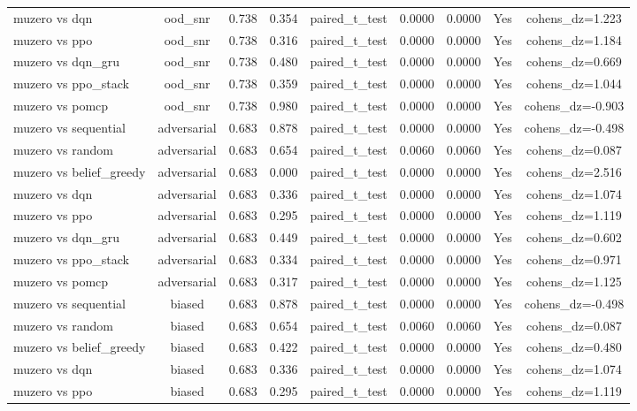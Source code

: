 \begin{table}[htbp]
\begin{tabular}{lcccccccc}
muzero vs dqn & ood_snr & 0.738 & 0.354 & paired_t_test & 0.0000 & 0.0000 & Yes & cohens_dz=1.223 \\
muzero vs ppo & ood_snr & 0.738 & 0.316 & paired_t_test & 0.0000 & 0.0000 & Yes & cohens_dz=1.184 \\
muzero vs dqn_gru & ood_snr & 0.738 & 0.480 & paired_t_test & 0.0000 & 0.0000 & Yes & cohens_dz=0.669 \\
muzero vs ppo_stack & ood_snr & 0.738 & 0.359 & paired_t_test & 0.0000 & 0.0000 & Yes & cohens_dz=1.044 \\
muzero vs pomcp & ood_snr & 0.738 & 0.980 & paired_t_test & 0.0000 & 0.0000 & Yes & cohens_dz=-0.903 \\
muzero vs sequential & adversarial & 0.683 & 0.878 & paired_t_test & 0.0000 & 0.0000 & Yes & cohens_dz=-0.498 \\
muzero vs random & adversarial & 0.683 & 0.654 & paired_t_test & 0.0060 & 0.0060 & Yes & cohens_dz=0.087 \\
muzero vs belief_greedy & adversarial & 0.683 & 0.000 & paired_t_test & 0.0000 & 0.0000 & Yes & cohens_dz=2.516 \\
muzero vs dqn & adversarial & 0.683 & 0.336 & paired_t_test & 0.0000 & 0.0000 & Yes & cohens_dz=1.074 \\
muzero vs ppo & adversarial & 0.683 & 0.295 & paired_t_test & 0.0000 & 0.0000 & Yes & cohens_dz=1.119 \\
muzero vs dqn_gru & adversarial & 0.683 & 0.449 & paired_t_test & 0.0000 & 0.0000 & Yes & cohens_dz=0.602 \\
muzero vs ppo_stack & adversarial & 0.683 & 0.334 & paired_t_test & 0.0000 & 0.0000 & Yes & cohens_dz=0.971 \\
muzero vs pomcp & adversarial & 0.683 & 0.317 & paired_t_test & 0.0000 & 0.0000 & Yes & cohens_dz=1.125 \\
muzero vs sequential & biased & 0.683 & 0.878 & paired_t_test & 0.0000 & 0.0000 & Yes & cohens_dz=-0.498 \\
muzero vs random & biased & 0.683 & 0.654 & paired_t_test & 0.0060 & 0.0060 & Yes & cohens_dz=0.087 \\
muzero vs belief_greedy & biased & 0.683 & 0.422 & paired_t_test & 0.0000 & 0.0000 & Yes & cohens_dz=0.480 \\
muzero vs dqn & biased & 0.683 & 0.336 & paired_t_test & 0.0000 & 0.0000 & Yes & cohens_dz=1.074 \\
muzero vs ppo & biased & 0.683 & 0.295 & paired_t_test & 0.0000 & 0.0000 & Yes & cohens_dz=1.119 \\

\end{tabular}
\end{table}
